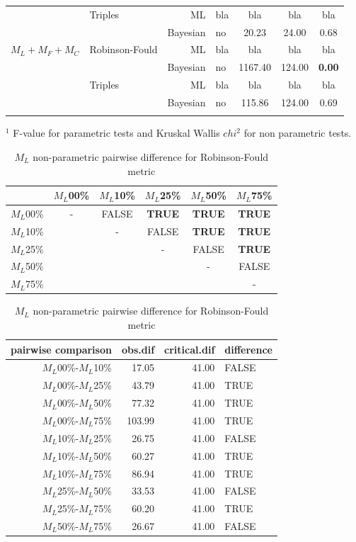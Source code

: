 \documentclass[12pt,letterpaper]{article}
\begin{document}
\begin{table}
\begin{tabular}{rlrlccc}
              & Triples & ML & bla & bla & bla & bla \\
              &         & Bayesian & no & 20.23 & 24.00 & 0.68 \\
    $M_L+M_F+M_C$ & Robinson-Fould & ML & bla & bla & bla & bla \\
                  &                & Bayesian & no & 1167.40 & 124.00 & \textbf{0.00} \\
                  & Triples & ML & bla & bla & bla & bla \\
                  &         & Bayesian & no & 115.86 & 124.00 & 0.69 \\ 
    \hline
\label{Group_results}
\end{tabular}

$^1$ F-value for parametric tests and Kruskal Wallis $chi^2$ for non parametric tests.
\end{table}

\begin{table}
\caption{$M_L$ non-parametric pairwise difference for Robinson-Fould metric}
\centering
\begin{tabular}{c|ccccc}
    \hline
              & $M_L$00\% & $M_L$10\% & $M_L$25\% & $M_L$50\% & $M_L$75\% \\
    \hline
    $M_L$00\% & - & FALSE & \textbf{TRUE} & \textbf{TRUE} & \textbf{TRUE}\\
    $M_L$10\% & & - & FALSE & \textbf{TRUE} & \textbf{TRUE} \\
    $M_L$25\% & & & - & FALSE & \textbf{TRUE} \\
    $M_L$50\% & & & & - & FALSE \\
    $M_L$75\% & & & & & - \\
    \hline
\end{tabular}
\centering
\begin{tabular}{rrrl}
 pairwise comparison & obs.dif & critical.dif & difference \\ 
  \hline
  $M_L$00\%-$M_L$10\% & 17.05 & 41.00 & FALSE \\ 
  $M_L$00\%-$M_L$25\% & 43.79 & 41.00 & TRUE \\ 
  $M_L$00\%-$M_L$50\% & 77.32 & 41.00 & TRUE \\ 
  $M_L$00\%-$M_L$75\% & 103.99 & 41.00 & TRUE \\ 
  $M_L$10\%-$M_L$25\% & 26.75 & 41.00 & FALSE \\ 
  $M_L$10\%-$M_L$50\% & 60.27 & 41.00 & TRUE \\ 
  $M_L$10\%-$M_L$75\% & 86.94 & 41.00 & TRUE \\ 
  $M_L$25\%-$M_L$50\% & 33.53 & 41.00 & FALSE \\ 
  $M_L$25\%-$M_L$75\% & 60.20 & 41.00 & TRUE \\ 
  $M_L$50\%-$M_L$75\% & 26.67 & 41.00 & FALSE \\ 
   \hline
\end{tabular}
\label{ML_results}
\end{table}
\end{document}
